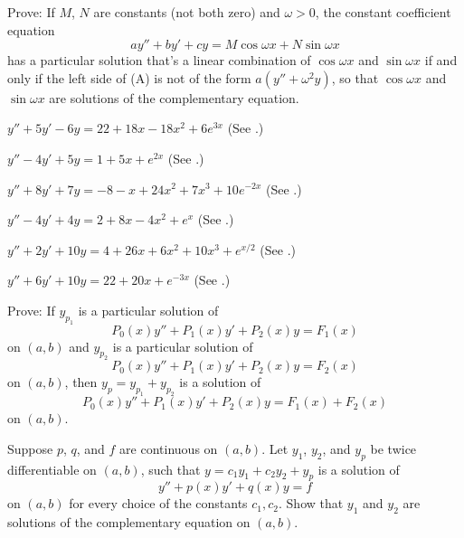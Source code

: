 \begin{exerciselist}
\item\label{exer:5.3.32}Prove: If $M$, $N$ are constants (not both zero)   and
$\omega>0$,   the constant coefficient equation
\[
ay''+by'+cy=M\cos\omega x+N\sin\omega x
\tag{A}
\]
has a particular solution that's a linear combination
of $\cos\omega x$ and $\sin\omega x$
 if and only if the left side of (A)
is not of the form $a(y''+\omega^2y)$, so that $\cos\omega x$
and $\sin\omega x$ are solutions of the complementary equation.


\item\label{exer:5.3.33}$y''+5y'-6y=22+18x-18x^2+6e^{3x}$
(See .)

\item\label{exer:5.3.34}$y''-4y'+5y=1+5x+e^{2x}$
(See .)

\item\label{exer:5.3.35}$y''+8y'+7y=-8-x+24x^2+7x^3+10e^{-2x}$
(See .)

\item\label{exer:5.3.36}$y''-4y'+4y=2+8x-4x^2+e^{x}$
(See .)

\item\label{exer:5.3.37}$y''+2y'+10y=4+26x+6x^2+10x^3+e^{x/2}$
(See .)

\item\label{exer:5.3.38}$y''+6y'+10y=22+20x+e^{-3x}$
(See .)

\item\label{exer:5.3.39}Prove: If $y_{p_1}$
is a particular solution of
\[
P_0(x)y''+P_1(x)y'+P_2(x)y=F_1(x)
\]
on $(a,b)$ and $y_{p_2}$ is a particular solution of
\[
P_0(x)y''+P_1(x)y'+P_2(x)y=F_2(x)
\]
on  $(a,b)$, then $y_p=y_{p_1}+y_{p_2}$ is a solution of
\[
P_0(x)y''+P_1(x)y'+P_2(x)y=F_1(x)+F_2(x)
\]
on $(a,b)$.

\item\label{exer:5.3.40}Suppose $p$, $q$, and $f$ are continuous on $(a,b)$.
Let $y_1$, $y_2$, and $y_p$ be twice differentiable on $(a,b)$, such
that $y=c_1y_1+c_2y_2+y_p$ is a solution of
\[
y''+p(x)y'+q(x)y=f
\]
on $(a,b)$  for every choice of the
constants $c_1,c_2$. Show that  $y_1$  and $y_2$ are solutions of
the complementary equation on $(a,b)$.

\end{exerciselist}

